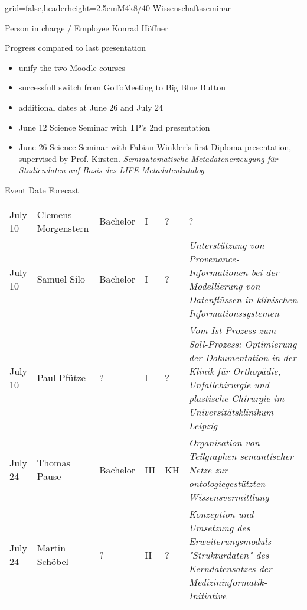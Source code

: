 \documentclass[english]{kiesgrube}
\begin{document}
\begin{poster}{grid=false,headerheight=2.5em}{}{M4k8/40 Wissenschaftsseminar}{}{}
\begin{posterbox}[name=person,column=0,row=0]{Person in charge / Employee}
Konrad Höffner
\end{posterbox}
\begin{posterbox}[name=progress,below=person]{Progress compared to last presentation}
\footnotesize
\begin{itemize}
\item unify the two Moodle courses
\item successfull switch from GoToMeeting to Big Blue Button
\item additional dates at June 26 and July 24
\item June 12 	Science Seminar with TP's 2nd presentation
\item June 26 	Science Seminar with Fabian Winkler's first Diploma presentation, supervised by Prof. Kirsten. \emph{Semiautomatische Metadatenerzeugung für Studiendaten auf Basis des LIFE-Metadatenkatalog}
\end{itemize}
\end{posterbox}
\begin{posterbox}[name=event,below=progress,span=2]{Event Date Forecast}
\small
\begin{tabulary}{\textwidth}{lllllL}
July 10	&Clemens Morgenstern		&Bachelor	&I		&?	&?\\
July 10	&Samuel Silo			&Bachelor	&I		&?	&\emph{Unterstützung von Provenance-Informationen bei der Modellierung von Datenflüssen in klinischen Informationssystemen}\\
July 10	&Paul Pfütze			&?		&I		&?	&\emph{Vom Ist-Prozess zum Soll-Prozess: Optimierung der Dokumentation in der Klinik für Orthopädie, Unfallchirurgie und plastische Chirurgie im Universitätsklinikum Leipzig}\\
July 24 &Thomas Pause			&Bachelor	&III		&KH	&\emph{Organisation von Teilgraphen semantischer Netze zur ontologiegestützten Wissensvermittlung}\\
July 24 &Martin Schöbel			&?		&II		&?	&\emph{Konzeption und Umsetzung des Erweiterungsmoduls "Strukturdaten" des Kerndatensatzes der Medizininformatik-Initiative}\\

\end{tabulary}
\end{posterbox}
\end{poster}
\end{document}
